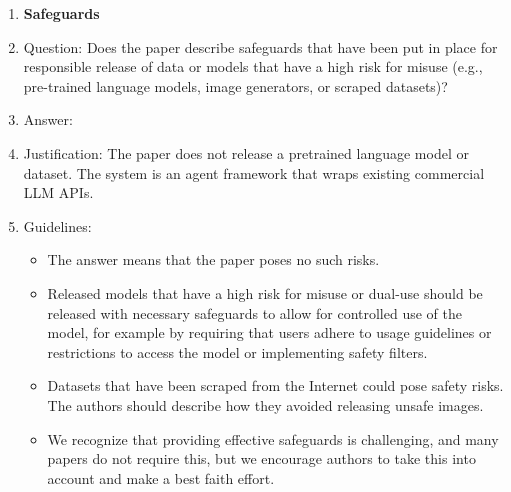 \documentclass{article}
\begin{document}
\begin{enumerate}
\item {\bf Safeguards}
    \item[] Question: Does the paper describe safeguards that have been put in place for responsible release of data or models that have a high risk for misuse (e.g., pre-trained language models, image generators, or scraped datasets)?
    \item[] Answer: \answerNA{}
    \item[] Justification: The paper does not release a pretrained language model or dataset. The system is an agent framework that wraps existing commercial LLM APIs.
    \item[] Guidelines:
    \begin{itemize}
        \item The answer \answerNA{} means that the paper poses no such risks.
        \item Released models that have a high risk for misuse or dual-use should be released with necessary safeguards to allow for controlled use of the model, for example by requiring that users adhere to usage guidelines or restrictions to access the model or implementing safety filters. 
        \item Datasets that have been scraped from the Internet could pose safety risks. The authors should describe how they avoided releasing unsafe images.
        \item We recognize that providing effective safeguards is challenging, and many papers do not require this, but we encourage authors to take this into account and make a best faith effort.
    \end{itemize}


\end{enumerate}
\end{document}
